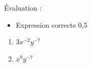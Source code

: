 %
%
    Évaluation :
    \begin{itemize}
        \item Expression correcte \hfill 0,5
    \end{itemize}
\begin{enumerate}[cols=2]
    \item $3x^{-2}y^{-7}$
    \item $x^9y^{-7}$
\end{enumerate}
